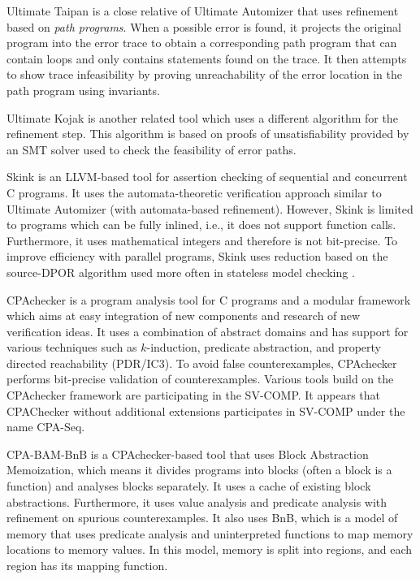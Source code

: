 Ultimate Taipan  is a close relative of Ultimate Automizer that uses refinement based on \emph{path programs}.
When a possible error is found, it projects the original program into the error trace to obtain a corresponding path program that can contain loops and only contains statements found on the trace.
It then attempts to show trace infeasibility by proving unreachability of the error location in the path program using invariants.

Ultimate Kojak  is another related tool which uses a different algorithm for the refinement step.
This algorithm is based on proofs of unsatisfiability provided by an SMT solver used to check the feasibility of error paths.

Skink  is an LLVM-based tool for assertion checking of sequential and concurrent C programs.
It uses the automata-theoretic verification approach similar to Ultimate Automizer (with automata-based refinement).
However, Skink is limited to programs which can be fully inlined, i.e., it does not support function calls.
Furthermore, it uses mathematical integers and therefore is not bit-precise.
To improve efficiency with parallel programs, Skink uses reduction based on the source-DPOR algorithm used more often in stateless model checking .

CPAchecker  is a program analysis tool for C programs and a modular framework which aims at easy integration of new components and research of new verification ideas.
It uses a combination of abstract domains and has support for various techniques such as $k$-induction, predicate abstraction, and property directed reachability (PDR/IC3).
To avoid false counterexamples, CPAchecker performs bit-precise validation of counterexamples.
Various tools build on the CPAchecker framework are participating in the SV-COMP.
It appears that CPAChecker without additional extensions participates in SV-COMP under the name CPA-Seq.

CPA-BAM-BnB  is a CPAchecker-based tool that uses Block Abstraction Memoization, which means it divides programs into blocks (often a block is a function) and analyses blocks separately.
It uses a cache of existing block abstractions.
Furthermore, it uses value analysis and predicate analysis with refinement on spurious counterexamples.
It also uses BnB, which is a model of memory that uses predicate analysis and uninterpreted functions to map memory locations to memory values.
In this model, memory is split into regions, and each region has its mapping function.

